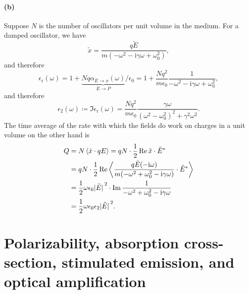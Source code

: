 \documentclass[hyperref, a4paper]{article}
\newcommand*{\ii}{\mathrm{i}}
\newcommand{\epsr}{\epsilon_{\text{r}}}
\begin{document}
\paragraph{(b)} Suppose $N$ is the number of oscillators per unit volume in the medium.
For a damped oscillator, we have 
\begin{equation}
    \tilde{x} = \frac{q \tilde{E}}{m (- \omega^2 - \ii \gamma \omega + \omega_0^2)},
\end{equation}
and therefore 
\begin{equation}
    \epsr(\omega) = 1 + \underbrace{N q \alpha_{
         E \to x
    } (\omega)}_{E \to P} / \epsilon_0
    = 1 + \frac{N q^2}{m \epsilon_0} \frac{1}{
        - \omega^2 - \ii \gamma \omega + \omega_0^2
    },
\end{equation}
and therefore
\begin{equation}
    \epsilon_2(\omega) \coloneqq \Im \epsr(\omega)
    = \frac{N q^2}{m \epsilon_0} \frac{\gamma \omega}{
        (\omega^2 - \omega_0^2)^2 + \gamma^2 \omega^2
    }.
\end{equation}
The time average of the rate with which the fields do work 
on charges in a unit volume on the other hand is 
\begin{equation}
    \begin{aligned}
        Q &= N \expval{\dot{x} \cdot q E}
        = q N \cdot \frac{1}{2} \Re \tilde{x} \cdot \tilde{E}^* \\
        &= q N \cdot \frac{1}{2} \Re \expval{
            \frac{q \tilde{E} (- \ii \omega)}{
                m (- \omega^2 + \omega_0^2 - \ii \gamma \omega)
            } \cdot \tilde{E}^*
        } \\
        &= \frac{1}{2} \omega \epsilon_0 \abs*{\tilde{E}}^2 \cdot 
        \Im \frac{1}{
            - \omega^2 + \omega_0^2 - \ii \gamma \omega
        } \\
        &= \frac{1}{2} \omega \epsilon_0 \epsilon_2 \abs*{\tilde{E}}^2.
    \end{aligned}
\end{equation}

\section{Polarizability, absorption cross-section, stimulated emission, and optical amplification}
\end{document}
